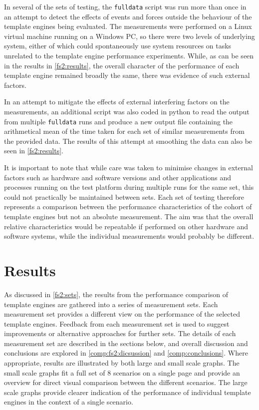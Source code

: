 In several of the sets of testing, the \texttt{fulldata} script was run more than once in an attempt to detect the effects of events and forces outside the behaviour of the \gls{template engine}s being evaluated. The measurements were performed on a Linux virtual machine running on a Windows PC, so there were two levels of underlying system, either of which could spontaneously use system resources on tasks unrelated to the \gls{template engine} performance experiments. While, as can be seen in the results in \autoref{fs2:results}, the overall character of the performance of each \gls{template engine} remained broadly the same, there was evidence of such external factors.

In an attempt to mitigate the effects of external interfering factors on the measurements, an additional script was also coded in python to read the output from multiple \texttt{fulldata} runs and produce a new output file containing the arithmetical mean of the time taken for each set of similar measurements from the provided data. The results of this attempt at smoothing the data can also be seen in \autoref{fs2:results}.

It is important to note that while care was taken to minimise changes in external factors such as hardware and software versions and other applications and processes running on the test platform during multiple runs for the same set, this could not practically be maintained between sets. Each set of testing therefore represents a comparison between the performance characteristics of the cohort of \gls{template engine}s but not an absolute measurement. The aim was that the overall relative characteristics would be repeatable if performed on other hardware and software systems, while the individual measurements would probably be different.

\section{Results}
\label{fs2:results}

As discussed in \autoref{fs2:sets},  the results from the performance comparison of \gls{template engine}s are gathered into a series of measurement sets. Each measurement set provides a different view on the performance of the selected \gls{template engine}s. Feedback from each measurement set is used to suggest improvements or alternative approaches for further sets. The details of each measurement set are described in the sections below, and overall discussion and conclusions are explored in \autoref{comp:fs2:dicsussion} and \autoref{comp:conclusions}. Where appropriate, results are illustrated by both large and small scale graphs. The small scale graphs fit a full set of 8 scenarios on a single page and provide an overview for direct visual comparison between the different scenarios. The large scale graphs provide clearer indication of the performance of individual \gls{template engine}s in the context of a single scenario.

